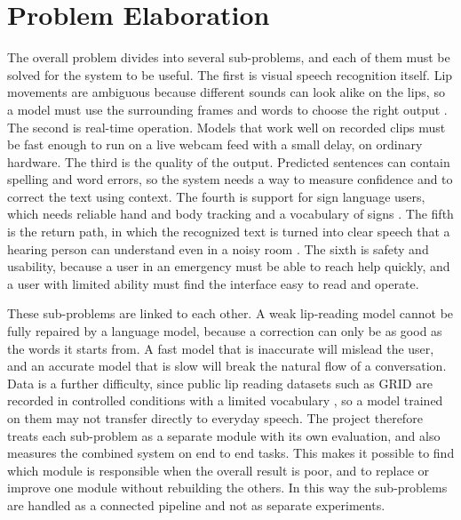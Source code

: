\documentclass{FastFyp}
\begin{document}
\section{Problem Elaboration}
The overall problem divides into several sub-problems, and each of them must be solved for the system to be useful. The first is visual speech recognition itself. Lip movements are ambiguous because different sounds can look alike on the lips, so a model must use the surrounding frames and words to choose the right output \cite{assael2016lipnet}. The second is real-time operation. Models that work well on recorded clips must be fast enough to run on a live webcam feed with a small delay, on ordinary hardware. The third is the quality of the output. Predicted sentences can contain spelling and word errors, so the system needs a way to measure confidence and to correct the text using context. The fourth is support for sign language users, which needs reliable hand and body tracking and a vocabulary of signs \cite{koller2016deepsign}. The fifth is the return path, in which the recognized text is turned into clear speech that a hearing person can understand even in a noisy room \cite{valin2018hybrid}. The sixth is safety and usability, because a user in an emergency must be able to reach help quickly, and a user with limited ability must find the interface easy to read and operate.

These sub-problems are linked to each other. A weak lip-reading model cannot be fully repaired by a language model, because a correction can only be as good as the words it starts from. A fast model that is inaccurate will mislead the user, and an accurate model that is slow will break the natural flow of a conversation. Data is a further difficulty, since public lip reading datasets such as GRID are recorded in controlled conditions with a limited vocabulary \cite{cooke2006grid}, so a model trained on them may not transfer directly to everyday speech. The project therefore treats each sub-problem as a separate module with its own evaluation, and also measures the combined system on end to end tasks. This makes it possible to find which module is responsible when the overall result is poor, and to replace or improve one module without rebuilding the others. In this way the sub-problems are handled as a connected pipeline and not as separate experiments.
\end{document}

